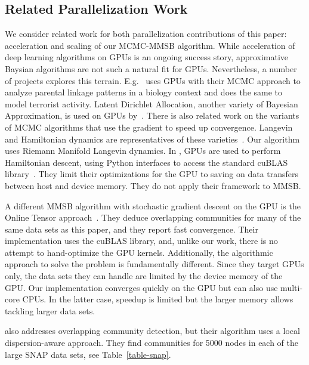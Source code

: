 \subsection{Related Parallelization Work}
\label{sec-related}

We consider related work for both parallelization contributions of this paper: acceleration and scaling
of our MCMC-MMSB algorithm. While acceleration of deep learning algorithms on GPUs
is an ongoing success story, approximative Baysian algorithms are
not such a natural fit for GPUs. Nevertheless, a number of projects explores this terrain.
E.g.~\cite{journals/bioinformatics/MedlarGSBK13} uses GPUs with their
MCMC approach to analyze parental linkage patterns in a biology context and
\cite{DBLP:journals/csda/WhiteP14} does the same to model terrorist activity.
Latent Dirichlet Allocation, another variety of Bayesian Approximation,
is used on GPUs by~\cite{DBLP:conf/nips/YanXQ09}. There is also related
work on the variants of MCMC algorithms that use the gradient to speed
up convergence. Langevin and Hamiltonian dynamics are representatives of
these varieties~\cite{Girolami_riemannmanifold}. Our algorithm uses Riemann
Manifold Langevin dynamics. In \cite{beam2014fast}, GPUs are used to perform
Hamiltonian descent, using Python interfaces to access the standard cuBLAS
library~\cite{cuBLAS}. They limit their optimizations for the GPU to saving
on data transfers between host and device memory. They do not apply their
framework to MMSB.

A different MMSB algorithm with stochastic gradient descent on the GPU is
the Online Tensor approach~\cite{DBLP:journals/corr/HuangNHVA13}. They deduce
overlapping communities for many of the same data sets as this paper, and they
report fast convergence. Their implementation uses the cuBLAS
library, and, unlike our work, there is no attempt to hand-optimize the GPU
kernels. Additionally, the algorithmic approach to solve the problem is
fundamentally different.
Since they target GPUs only, the data sets they
can handle are limited by the device memory of the GPU. Our implementation converges
quickly on the GPU but can also use multi-core CPUs. In the latter case, speedup is
limited but the larger memory allows tackling larger data sets.

\cite{liakos-bigdata16} also addresses overlapping community detection, but their
algorithm uses a local dispersion-aware approach. They find communities for 5000
nodes in each of the large SNAP data sets, see Table~\ref{table-snap}.

